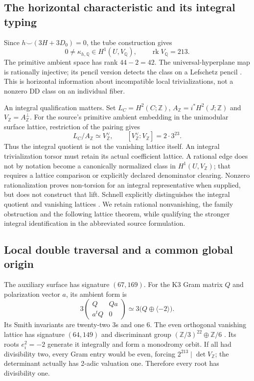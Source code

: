 \documentclass[11pt,a4paper]{article}
\begin{document}
\subsection{The horizontal characteristic and its integral typing}
\label{sec:deligne-leray}
Since \(h\smile(3H+3D_0)=0\), the tube construction gives
\[
 0\ne\kappa_{h,\mathbb Q}\in H^1(U,V_{\mathbb Q}),\qquad
 \operatorname{rk}V_{\mathbb Q}=213 .
 \tag{D5}\label{eq:deligne-leray}
\]
The primitive ambient space has rank \(44-2=42\). The
universal-hyperplane map is rationally injective; its pencil
version detects the class on a Lefschetz pencil
\cite{PreprojectionLerayDD2026,SchnellTube2009}.
This is horizontal information about incompatible local
trivializations, not a nonzero DD class on an individual fiber.

An integral qualification matters. Set \(L_C=H^2(C;\mathbb Z)\),
\(A_{\mathbb Z}=i^*H^2(J;\mathbb Z)\) and
\(V_{\mathbb Z}=A_{\mathbb Z}^{\perp}\).
For the source's primitive ambient embedding in the unimodular
surface lattice, restriction of the pairing gives
\[
 L_C/A_{\mathbb Z}\simeq V_{\mathbb Z}^{\vee},\qquad
 [V_{\mathbb Z}^{\vee}:V_{\mathbb Z}]=2\cdot3^{23}.
 \tag{D6}\label{eq:deligne-integral-comparison}
\]
Thus the integral quotient is not the vanishing lattice itself.
An integral trivialization torsor must retain its actual coefficient
lattice. A rational edge does not by notation become a canonically
normalized class in \(H^1(U,V_{\mathbb Z})\); that requires a
lattice comparison or explicitly declared denominator clearing.
Nonzero rationalization proves non-torsion for an integral
representative when supplied, but does not construct that lift.
Schnell explicitly distinguishes the integral quotient and vanishing
lattices \cite{SchnellTube2009}. We retain rational nonvanishing,
the family obstruction and the following lattice theorem, while
qualifying the stronger integral identification in the abbreviated
source formulation.

\subsection{Local double traversal and a common global origin}
\label{sec:deligne-local-global}
The auxiliary surface has signature \((67,169)\). For the K3
Gram matrix \(Q\) and polarization vector \(a\), its ambient form is
\[
 3\begin{pmatrix}Q&Qa\\a^tQ&0\end{pmatrix}
       \simeq3\bigl(Q\oplus\langle-2\rangle\bigr).
\]
Its Smith invariants are twenty-two 3s and one 6. The even
orthogonal vanishing lattice has signature \((64,149)\) and
discriminant group \((\mathbb Z/3)^{22}\oplus\mathbb Z/6\)
\cite{PreprojectionPencilLattice2026}.
Its roots \(e_i^2=-2\) generate it integrally and form a monodromy
orbit. If all had divisibility two, every Gram entry would be even,
forcing \(2^{213}\mid\det V_{\mathbb Z}\); the determinant actually
has 2-adic valuation one. Therefore every root has divisibility one.
\end{document}
